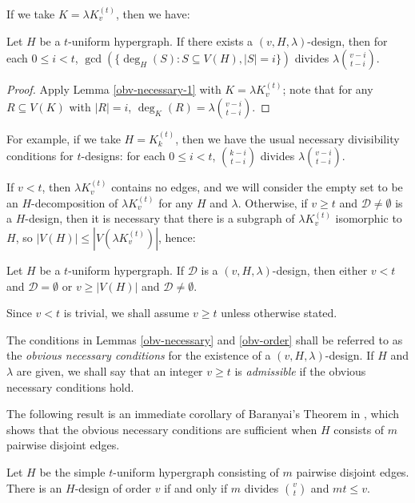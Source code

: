 If we take $K = \lambda K_v^{(t)}$, then we have:

\begin{lemma} \label{obv-necessary}
Let $H$ be a $t$-uniform hypergraph.
If there exists a $(v, H, \lambda)$-design, then for each $0 \leq i < t$,
  $\gcd(\{ \deg_H(S) : S \subseteq V(H), |S| = i \})$ divides $\lambda {v-i \choose t-i}$.
\end{lemma}

\begin{proof}
Apply Lemma \ref{obv-necessary-1} with $K = \lambda K_v^{(t)}$;
  note that for any $R \subseteq V(K)$ with $|R| = i$, $\deg_K(R) = \lambda {v-i \choose t-i}$.
\end{proof}

For example, if we take $H = K_k^{(t)}$, then we have the usual necessary divisibility conditions for $t$-designs: for each $0 \leq i < t$, ${k-i \choose t-i}$ divides $\lambda {v-i \choose t-i}$.

If $v < t$, then $\lambda K_v^{(t)}$ contains no edges, and we will consider the empty set to be an $H$-decomposition of $\lambda K_v^{(t)}$ for any $H$ and $\lambda$. Otherwise, if $v \geq t$ and $\mathcal{D} \neq \emptyset$ is a $H$-design, then it is necessary that there is a subgraph of $\lambda K_v^{(t)}$ isomorphic to $H$, so $|V(H)| \leq |V(\lambda K_v^{(t)})|$, hence:

\begin{lemma} \label{obv-order}
Let $H$ be a $t$-uniform hypergraph. If $\mathcal{D}$ is a $(v, H, \lambda)$-design, then either $v < t$ and $\mathcal{D} = \emptyset$ or $v \geq |V(H)|$ and $\mathcal{D} \neq \emptyset$.
\end{lemma}

Since $v < t$ is trivial, we shall assume $v \geq t$ unless otherwise stated.

The conditions in Lemmas \ref{obv-necessary} and \ref{obv-order} shall be referred to as the {\em obvious necessary conditions} for the existence of a $(v, H, \lambda)$-design.
If $H$ and $\lambda$ are given, we shall say that an integer $v \geq t$ is {\em admissible} if the obvious necessary conditions hold.

The following result is an immediate corollary of Baranyai's Theorem in \cite{baran}, which shows that the obvious necessary conditions are sufficient when $H$ consists of $m$ pairwise disjoint edges.

\begin{theorem} \label{baranyai}
Let $H$ be the simple $t$-uniform hypergraph consisting of $m$ pairwise disjoint edges. There is an $H$-design of order $v$ if and only if $m$ divides ${v \choose t}$ and $mt \leq v$.
\end{theorem}
